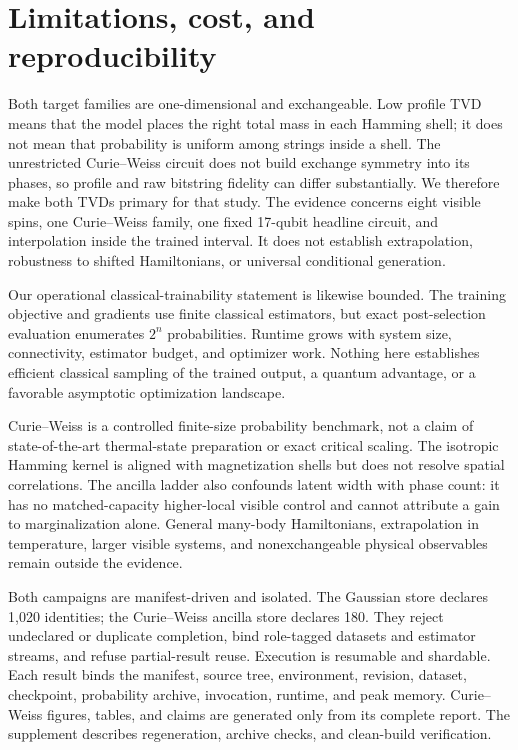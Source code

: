 \documentclass[a4paper,twocolumn,11pt,unpublished]{quantumarticle}
\begin{document}
\section{Limitations, cost, and reproducibility}

Both target families are one-dimensional and exchangeable.  Low profile TVD
means that the model places the right total mass in each Hamming shell; it does
not mean that probability is uniform among strings inside a shell.  The
unrestricted Curie--Weiss circuit does not build exchange symmetry into its
phases, so profile and raw bitstring fidelity can differ substantially.  We
therefore make both TVDs primary for that study.  The evidence concerns eight
visible spins, one Curie--Weiss family, one fixed 17-qubit headline circuit,
and interpolation inside the trained interval.  It does not establish
extrapolation, robustness to shifted Hamiltonians, or universal conditional
generation.

Our operational classical-trainability statement is likewise bounded.  The
training objective and gradients use finite classical estimators, but exact
post-selection evaluation enumerates $2^n$ probabilities.  Runtime grows with
system size, connectivity, estimator budget, and optimizer work.  Nothing here
establishes efficient classical sampling of the trained output, a quantum
advantage, or a favorable asymptotic optimization landscape.

Curie--Weiss is a controlled finite-size probability benchmark, not a claim
of state-of-the-art thermal-state preparation or exact critical scaling.
The isotropic Hamming kernel is aligned with magnetization shells but does not
resolve spatial correlations.  The ancilla ladder also confounds latent width
with phase count: it has no matched-capacity higher-local visible control and
cannot attribute a gain to marginalization alone.  General many-body
Hamiltonians, extrapolation in temperature, larger visible systems, and
nonexchangeable physical observables remain outside the evidence.

Both campaigns are manifest-driven and isolated.  The Gaussian store declares
1,020 identities; the Curie--Weiss ancilla store declares 180.  They reject
undeclared or duplicate completion, bind role-tagged datasets and estimator
streams, and refuse partial-result reuse.  Execution is resumable and
shardable.  Each result binds the manifest, source tree, environment, revision,
dataset, checkpoint, probability archive, invocation, runtime, and peak
memory.  Curie--Weiss figures, tables, and claims are generated only from its
complete report.  The supplement describes regeneration, archive checks, and
clean-build verification.
\end{document}
